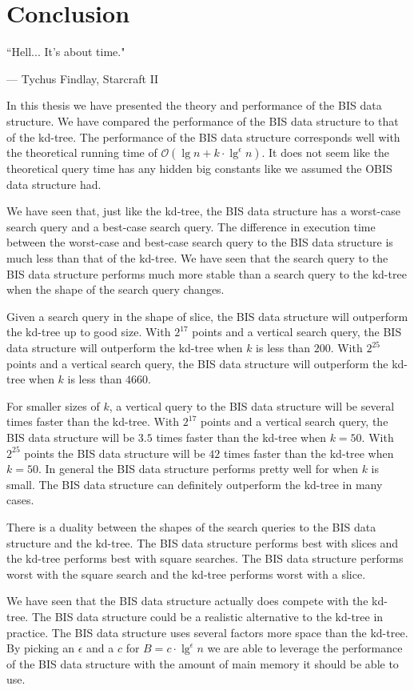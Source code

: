 \chapter{Conclusion}
\label{ch:conclusion}


\epigraph{``Hell... It's about time."}{--- \textup{Tychus Findlay}, Starcraft II}

In this thesis we have presented the theory and performance of the BIS data structure. We have compared the performance of the BIS data structure to that of the kd-tree. The performance of the BIS data structure corresponds well with the theoretical running time of $\mathcal{O}(\lg n + k\cdot\lg^\epsilon n)$. It does not seem like the theoretical query time has any hidden big constants like we assumed the OBIS data structure had.

We have seen that, just like the kd-tree, the BIS data structure has a worst-case search query and a best-case search query. The difference in execution time between the worst-case and best-case search query to the BIS data structure is much less than that of the kd-tree. We have seen that the search query to the BIS data structure performs much more stable than a search query to the kd-tree when the shape of the search query changes.

Given a search query in the shape of slice, the BIS data structure will outperform the kd-tree up to good size. With $2^{17}$ points and a vertical search query, the BIS data structure will outperform the kd-tree when $k$ is less than $200$. With $2^{25}$ points and a vertical search query, the BIS data structure will outperform the kd-tree when $k$ is less than $4660$. 

For smaller sizes of $k$, a vertical query to the BIS data structure will be several times faster than the kd-tree. With $2^{17}$ points and a vertical search query, the BIS data structure will be $3.5$ times faster than the kd-tree when $k = 50$. With $2^{25}$ points the BIS data structure will be $42$ times faster than the kd-tree when $k = 50$. In general the BIS data structure performs pretty well for when $k$ is small. The BIS data structure can definitely outperform the kd-tree in many cases.

There is a duality between the shapes of the search queries to the BIS data structure and the kd-tree. The BIS data structure performs best with slices and the kd-tree performs best with square searches. The BIS data structure performs worst with the square search and the kd-tree performs worst with a slice.

We have seen that the BIS data structure actually does compete with the kd-tree. The BIS data structure could be a realistic alternative to the kd-tree in practice. The BIS data structure uses several factors more space than the kd-tree. By picking an $\epsilon$ and a $c$ for $B = c\cdot\lg^\epsilon n$ we are able to leverage the performance of the BIS data structure with the amount of main memory it should be able to use.

